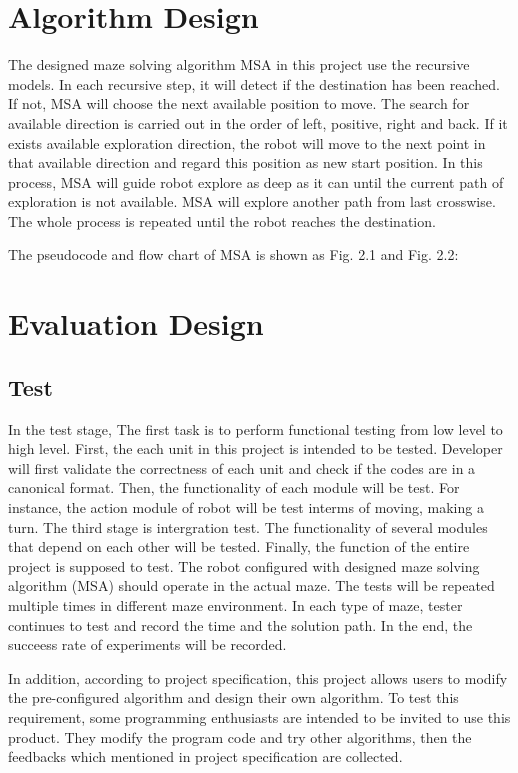 \documentclass[11pt,times,oneside,openright,hardcopy]{eeereport}
\begin{document}
\section{Algorithm Design}
The designed maze solving algorithm MSA in this project use the recursive models. In each recursive step, it will detect if the destination has been reached. If not, MSA will choose the next available position to move. 
The search for available direction is carried out in the order of left, positive, right and back. If it exists available exploration direction, the robot will move to the next point in that available direction and regard this position as new start position.
In this process, MSA will guide robot explore as deep as it can until the current path of exploration is not available. MSA will explore another path from last crosswise. The whole process is repeated until the robot reaches the destination. 

The pseudocode and flow chart of MSA is shown as Fig. 2.1 and Fig. 2.2:



\section{Evaluation Design}

\subsection{Test}
In the test stage, The first task is to perform functional testing from low level to high level. 
First, the each unit in this project is intended to be tested. Developer will first validate the correctness of each unit and check if the codes are in a canonical format. 
Then, the functionality of each module will be test. For instance, the action module of robot will be test interms of moving, making a turn.
The third stage is intergration test. The functionality of several modules that depend on each other will be tested.
Finally, the function of the entire project is supposed to test. The robot configured with designed maze solving algorithm (MSA) should operate in the actual maze.
The tests will be repeated multiple times in different maze environment. In each type of maze, tester continues to test and record the time and the solution path.
In the end, the succeess rate of experiments will be recorded.

In addition, according to project specification, this project allows users to modify the pre-configured algorithm and design their own algorithm. To test this requirement, some programming enthusiasts are intended to be invited to use this product.
They modify the program code and try other algorithms, then the feedbacks which mentioned in project specification are collected.
\end{document}
